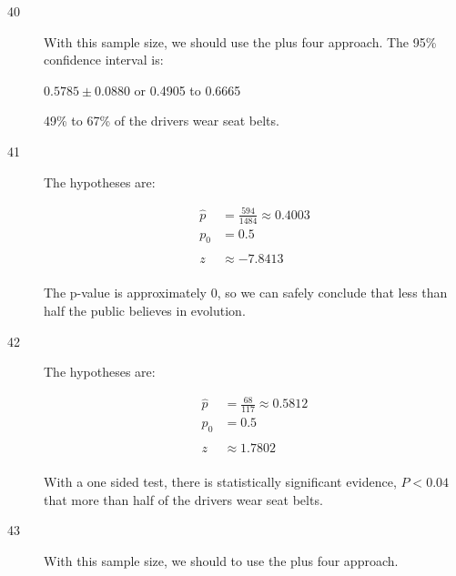 \documentclass[letterpaper]{exam}
\begin{document}
\begin{description}
     \item[40]
       With this sample size, we should use the plus four approach.
       The 95\% confidence interval is:

       $0.5785 \pm 0.0880$ or 0.4905 to 0.6665

       49\% to 67\% of the drivers wear seat belts.

     \item[41]
       The hypotheses are:

       \begin{align*}
          \hat{p} & = \frac{594}{1484} \approx 0.4003 \\
          p_0     & = 0.5 \\
          \\
          z       & \approx -7.8413 \\
        \end{align*}

        The p-value is approximately 0, so we can safely conclude that less than half
        the public believes in evolution.


     \item[42]
       The hypotheses are:

       \begin{align*}
          \hat{p} & = \frac{68}{117} \approx 0.5812 \\
          p_0     & = 0.5 \\
          \\
          z       & \approx 1.7802 \\
        \end{align*}

        With a one sided test, there is statistically significant evidence, 
        $P < 0.04$ that more than half of the drivers wear seat belts.

      \item[43]
        With this sample size, we should to use the plus four approach. 


\end{description}
\end{document}

